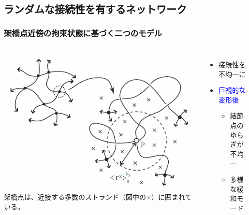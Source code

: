 \documentclass[12pt, dvipdfmx]{beamer}
\begin{document}
\subsection{ランダムな接続性を有するネットワーク}

\begin{frame}
	\frametitle{架橋点近傍の拘束状態に基づく二つのモデル}
		\begin{columns}[totalwidth=1\textwidth]
                \includegraphics[width=\textwidth]{JP_vicinity.png}
                架橋点は、\alert{近接する多数のストランド（図中の×）に囲まれている。}
                \begin{itemize}
                    \item 接続性を不均一に
                    \item \textcolor{blue}{巨視的な変形後}
                        \begin{itemize}
                            \item 結節点のゆらぎが\\不均一
                            \item 多様な緩和モード
                        \end{itemize}

\end{itemize}
\end{columns}
\end{frame}
\end{document}
